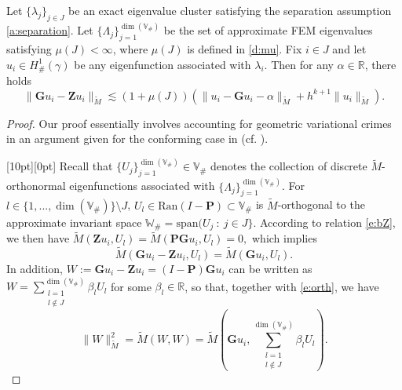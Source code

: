 \documentclass{siamart0516}
\newcommand{\bG}{\ensuremath{\boldsymbol G}}
\newcommand{\bP}{\ensuremath{\boldsymbol P}}
\newcommand{\bZ}{\ensuremath{\boldsymbol Z}}
\newcommand{\step}[1]{\noindent\raisebox{1.5pt}[10pt][0pt]{\tiny\framebox{$#1$}}\xspace}
\numberwithin{equation}{section}
\numberwithin{theorem}{section}
\numberwithin{figure}{section}
\begin{document}
\begin{lemma}\label{l:L2}
Let $\{\lambda_j\}_{j\in J}$ be an exact eigenvalue cluster satisfying the separation assumption \eqref{a:separation}.  Let $\{\Lambda_{j}\}_{j=1}^{\dim (\mathbb{V}_\#)}$ be the set of approximate FEM eigenvalues satisfying $\mu(J)<\infty$, where $\mu(J)$ is defined in \eqref{d:mu}.
Fix $i \in J$ and  let $u_i \in H^1_\#(\gamma)$ be any eigenfunction associated with $\lambda_i$.
Then for any $\alpha \in \mathbb{R}$, there holds
\begin{equation}\label{L2L}
\|\bG u_i - \bZ  u_i\|_{\widetilde M} \lesssim \left(1 +\mu(J)\right)(\| u_i- \bG u_i-\alpha\|_{\widetilde M} + h^{k+1}\|u_i\|_{\widetilde M}).
\end{equation}
\end{lemma}
\begin{proof} Our proof essentially involves accounting for geometric variational crimes in an argument given for the conforming case in \cite{CaGe11} (cf. \cite{Gallistl}).  

\step{1} Recall that $\{U_j\}_{j=1}^{\dim(\mathbb V_\#)} \in \mathbb V_\#$ denotes the collection of discrete $\widetilde M$-orthonormal eigenfunctions associated with $\{ \Lambda_j\}_{j=1}^{\dim(\mathbb V_\#)}$.
For $l \in \{1,...,\dim(\mathbb V_\#)\} \setminus J$, $U_{l} \in \text{Ran} (I -\bP) \subset \mathbb V_\#$ is $\widetilde M$-orthogonal to the approximate invariant space $\mathbb W_\# =\textrm{span}( U_j \ : \ j \in J \}$. 
According to relation \eqref{e:bZ}, we then have  $\widetilde M(\bZ  u_i,U_{l})  = \widetilde M(\bP \bG u_i,U_{l}) = 0,$
which implies
\begin{equation}\label{e:orth}
\widetilde M(\bG u_i - \bZ u_i, U_{l})  = \widetilde M(\bG u_i, U_{l}).
\end{equation}
In addition, $W := \bG u_i - \bZ u_i = (I-\bP)\bG u_i$ can be written as 
$
W = \sum_{\substack{l=1\\ l \not \in J}}^{\dim(\mathbb V_\#)} \beta_l U_{l}
$
for some $\beta_l \in \mathbb R$, so that, together with \eqref{e:orth}, we have
\begin{equation}\label{e:start}
\|W\|_{\widetilde M}^2 = \widetilde M(W,W) = \widetilde M\left(\bG u_i, \sum_{\substack{l=1\\l\not \in J}}^{\dim(\mathbb V_\#)} \beta_l U_{l}\right).
\end{equation}


\end{proof}
\end{document}
